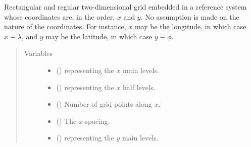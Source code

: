 \documentclass[letterpaper,10pt,english]{sphinxmanual}
\begin{document}
\begin{fulllineitems}
\label{\detokenize{api:grids.grid_xy.GridXY}}
Rectangular and regular two-dimensional grid embedded in a reference system whose coordinates are,
in the order, \(x\) and \(y\). No assumption is made on the nature of the coordinates. For
instance, \(x\) may be the longitude, in which case \(x \equiv \lambda\), and \(y\) may
be the latitude, in which case \(y \equiv \phi\).
\begin{quote}\begin{description}
\item[{Variables}] \leavevmode\begin{itemize}
\item {} 
{\hyperref[\detokenize{api:grids.grid_xyz.GridXYZ.x}]{}} () \textendash{} {\hyperref[\detokenize{api:grids.axis.Axis}]{}} representing the \(x\) main levels.

\item {} 
{\hyperref[\detokenize{api:grids.grid_xyz.GridXYZ.x_half_levels}]{}} () \textendash{} {\hyperref[\detokenize{api:grids.axis.Axis}]{}} representing the \(x\) half levels.

\item {} 
{\hyperref[\detokenize{api:grids.grid_xyz.GridXYZ.nx}]{}} () \textendash{} Number of grid points along \(x\).

\item {} 
{\hyperref[\detokenize{api:grids.grid_xyz.GridXYZ.dx}]{}} () \textendash{} The \(x\)-spacing.

\item {} 
{\hyperref[\detokenize{api:grids.grid_xyz.GridXYZ.y}]{}} () \textendash{} {\hyperref[\detokenize{api:grids.axis.Axis}]{}} representing the \(y\) main levels.


\end{itemize}
\end{description}
\end{quote}
\end{fulllineitems}
\end{document}
